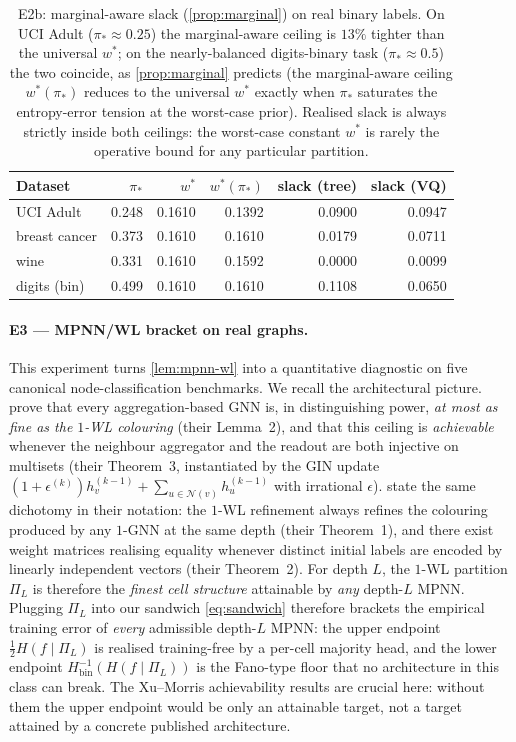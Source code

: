 \documentclass[10pt]{article}
\theoremstyle{definition}
\theoremstyle{remark}
\newcommand{\Hinv}{H_{\mathrm{bin}}^{-1}}
\begin{document}
\begin{table}[h]\centering\small
\begin{tabular}{lrrrrr}
\toprule
Dataset & $\pi_{*}$ & $w^{*}$ & $w^{*}(\pi_{*})$
        & slack (tree) & slack (VQ) \\
\midrule
UCI Adult     & 0.248 & 0.1610 & 0.1392 & 0.0900 & 0.0947 \\
breast cancer & 0.373 & 0.1610 & 0.1610 & 0.0179 & 0.0711 \\
wine          & 0.331 & 0.1610 & 0.1592 & 0.0000 & 0.0099 \\
digits (bin)  & 0.499 & 0.1610 & 0.1610 & 0.1108 & 0.0650 \\
\bottomrule
\end{tabular}
\caption{E2b: marginal-aware slack (\cref{prop:marginal}) on
real binary labels. On UCI Adult ($\pi_{*} \approx 0.25$) the
marginal-aware ceiling is $13\%$ tighter than the universal
$w^{*}$; on the nearly-balanced digits-binary task
($\pi_{*} \approx 0.5$) the two coincide, as
\cref{prop:marginal} predicts (the marginal-aware ceiling
$w^{*}(\pi_{*})$ reduces to the universal $w^{*}$ exactly when
$\pi_{*}$ saturates the entropy-error tension at the worst-case
prior).
Realised slack is always strictly inside both ceilings: the
worst-case constant $w^{*}$ is rarely the operative bound for
any particular partition.}
\label{tab:e2b}
\end{table}

\paragraph{E3 --- MPNN/WL bracket on real graphs.}
This experiment turns \cref{lem:mpnn-wl} into a quantitative
diagnostic on five canonical node-classification benchmarks. We
recall the architectural picture. \citet{xu2019gin} prove
that every aggregation-based GNN is, in distinguishing power,
\emph{at most as fine as the $1$-WL colouring} (their Lemma~2),
and that this ceiling is \emph{achievable} whenever the neighbour
aggregator and the readout are both injective on multisets (their
Theorem~3, instantiated by the GIN update
$(1 + \epsilon^{(k)}) h_v^{(k-1)} + \sum_{u \in \mathcal{N}(v)}
h_u^{(k-1)}$ with irrational $\epsilon$).
\citet{morris2019wl} state the same dichotomy in their notation:
the $1$-WL refinement always refines the colouring produced by
any $1$-GNN at the same depth (their Theorem~1), and there
exist weight matrices realising equality whenever distinct
initial labels are encoded by linearly independent vectors
(their Theorem~2). For depth $L$, the $1$-WL partition $\Pi_{L}$
is therefore the \emph{finest cell structure} attainable by
\emph{any} depth-$L$ MPNN. Plugging $\Pi_{L}$ into our sandwich
\eqref{eq:sandwich} therefore brackets the empirical training
error of \emph{every} admissible depth-$L$ MPNN: the upper
endpoint $\tfrac{1}{2} H(f \mid \Pi_{L})$ is realised
training-free by a per-cell majority head, and the lower
endpoint $\Hinv(H(f \mid \Pi_{L}))$ is the Fano-type floor that
no architecture in this class can break. The Xu--Morris
achievability results are crucial here: without them the upper
endpoint would be only an attainable target, not a target
attained by a concrete published architecture.
\end{document}
